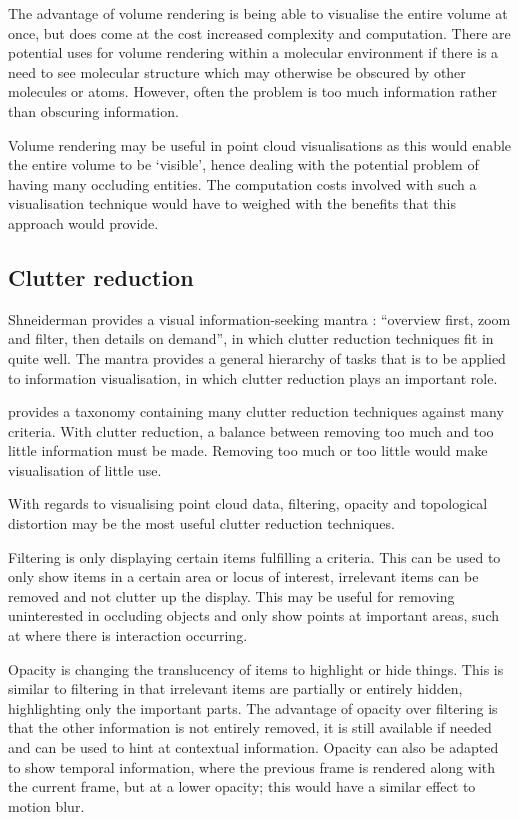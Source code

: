 \documentclass[a4paper]{article}
\begin{document}
The advantage of volume rendering is being able to visualise the entire volume
at once, but does come at the cost increased complexity and computation. There
are potential uses for volume rendering within a molecular environment if there
is a need to see molecular structure which may otherwise be obscured by other
molecules or atoms. However, often the problem is too much information rather
than obscuring information.

Volume rendering may be useful in point cloud visualisations as this would
enable the entire volume to be `visible', hence dealing with the potential
problem of having many occluding entities. The computation costs involved with
such a visualisation technique would have to weighed with the benefits that this
approach would provide.

\subsection*{Clutter reduction}
Shneiderman provides a visual information-seeking mantra \citep{shneiderman96}:
``overview first, zoom and filter, then details on demand'', in which clutter
reduction techniques fit in quite well. The mantra provides a general hierarchy
of tasks that is to be applied to information visualisation, in which clutter
reduction plays an important role.

\citet{ellis07} provides a taxonomy containing many clutter reduction techniques
against many criteria. With clutter reduction, a balance between removing too
much and too little information must be made. Removing too much or too little
would make visualisation of little use.

With regards to visualising point cloud data, filtering, opacity and topological
distortion may be the most useful clutter reduction techniques.

Filtering is only displaying certain items fulfilling a criteria. This can be
used to only show items in a certain area or locus of interest, irrelevant items
can be removed and not clutter up the display. This may be useful for removing
uninterested in occluding objects and only show points at important areas, such
at where there is interaction occurring.

Opacity is changing the translucency of items to highlight or hide things. This
is similar to filtering in that irrelevant items are partially or entirely
hidden, highlighting only the important parts. The advantage of opacity over
filtering is that the other information is not entirely removed, it is still
available if needed and can be used to hint at contextual information. Opacity
can also be adapted to show temporal information, where the previous frame is
rendered along with the current frame, but at a lower opacity; this would have a
similar effect to motion blur.
\end{document}
